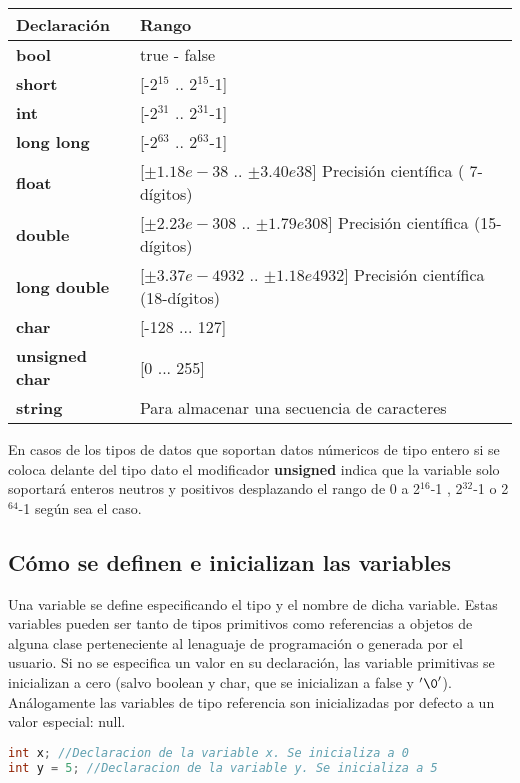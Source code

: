 \begin{tabular}{|p{2.5cm}|p{12.3cm}|}
	\hline 
	\textbf{Declaración}  & \textbf{Rango}   \\ 	
	\hline 
	\textbf{bool}  & true - false   \\ 
	\hline	
	\textbf{short}     & [-2$^{15}$ .. 2$^{15}$-1]   \\ 
	\hline	
	\textbf{int}    & [-2$^{31}$ .. 2$^{31}$-1]   \\ 
	\hline	
	\textbf{long long}  & [-2$^{63}$ .. 2$^{63}$-1]    \\ 
	\hline	
	\textbf{float}   & [$\pm1.18e-38 $ .. $\pm3.40e38$] Precisión científica ( 7-dígitos)  \\ 
	\hline	
	\textbf{double}     & [$\pm2.23e-308$ .. $\pm1.79e308$] Precisión científica (15-dígitos)  \\ 
	\hline	
	\textbf{long double}     & [$\pm3.37e-4932$ .. $\pm1.18e4932$]  Precisión científica (18-dígitos) \\ 
	\hline	
	\textbf{char} & [-128 ... 127]  \\ 
	\hline	
	\textbf{unsigned char} & [0 ... 255]  \\ 
	\hline
	\textbf{string} & Para almacenar una secuencia de caracteres  \\ 
	\hline
\end{tabular}
\vspace*{1em}

En casos de los tipos de datos que soportan datos númericos de tipo entero si se coloca delante del tipo dato el modificador \textbf{unsigned} indica que la variable solo soportará enteros neutros y positivos desplazando el rango de 0 a 2$^{16}$-1 , 2$^{32}$-1 o 2$^{64}$-1  según sea el caso.

\subsection{Cómo se definen e inicializan las variables}

Una variable se define especificando el tipo y el nombre de dicha variable. Estas variables pueden
ser tanto de tipos primitivos como referencias a objetos de alguna clase perteneciente al lenaguaje de programación o generada por el usuario. Si no se especifica un valor en su declaración, las variable
primitivas se inicializan a cero (salvo boolean y char, que se inicializan a false y $'\0'$).
Análogamente las variables de tipo referencia son inicializadas por defecto a un valor especial:
null.

\begin{lstlisting}[language=C++]
int x; //Declaracion de la variable x. Se inicializa a 0
int y = 5; //Declaracion de la variable y. Se inicializa a 5
\end{lstlisting} 

